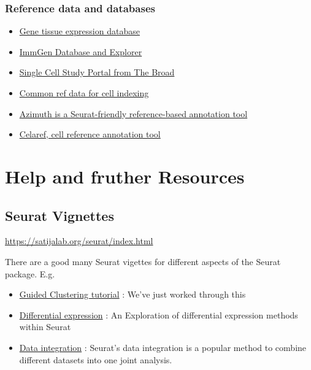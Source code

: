 \documentclass[
]{book}
\providecommand{\tightlist}{%
  \setlength{\itemsep}{0pt}\setlength{\parskip}{0pt}}
\begin{document}
\hypertarget{reference-data-and-databases}{%
\subsubsection{Reference data and databases}\label{reference-data-and-databases}}

\begin{itemize}
\tightlist
\item
  \href{https://gtexportal.org/home/}{Gene tissue expression database}
\item
  \href{https://www.immgen.org/Databrowser19/DatabrowserPage.html}{ImmGen Database and Explorer}
\item
  \href{https://singlecell.broadinstitute.org/single_cell}{Single Cell Study Portal from The Broad}
\item
  \href{http://bioconductor.org/packages/release/data/experiment/vignettes/celldex/inst/doc/userguide.html\#2_General-purpose_references}{Common ref data for cell indexing}
\item
  \href{https://azimuth.hubmapconsortium.org/references/\#Human\%20-\%20PBMC}{Azimuth is a Seurat-friendly reference-based annotation tool}
\item
  \href{https://www.bioconductor.org/packages/release/bioc/html/celaref.html}{Celaref, cell reference annotation tool}
\end{itemize}

\hypertarget{help-and-fruther-resources}{%
\section{Help and fruther Resources}\label{help-and-fruther-resources}}

\hypertarget{seurat-vignettes}{%
\subsection*{Seurat Vignettes}\label{seurat-vignettes}}

\url{https://satijalab.org/seurat/index.html}

There are a good many Seurat vigettes for different aspects of the Seurat package. E.g.

\begin{itemize}
\tightlist
\item
  \href{https://satijalab.org/seurat/articles/pbmc3k_tutorial.html}{Guided Clustering tutorial} : We've just worked through this
\item
  \href{https://satijalab.org/seurat/archive/v3.1/de_vignette.html}{Differential expression} : An Exploration of differential expression methods within Seurat
\item
  \href{https://satijalab.org/seurat/articles/integration_introduction.html}{Data integration} : Seurat's data integration is a popular method to combine different datasets into one joint analysis.
\end{itemize}
\end{document}
